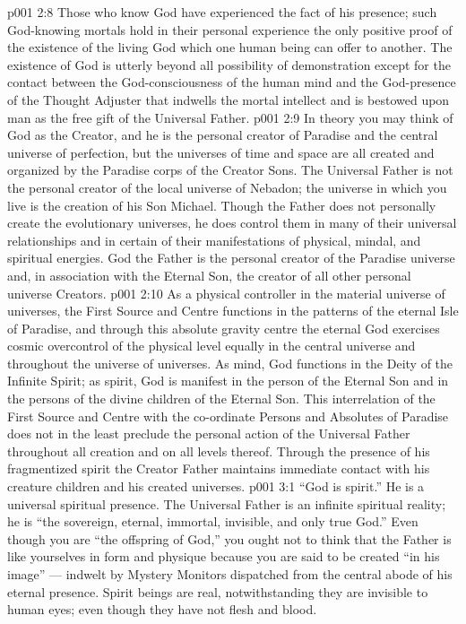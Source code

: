 \vs p001 2:8 Those who know God have experienced the fact of his presence; such God\hyp{}knowing mortals hold in their personal experience the only positive proof of the existence of the living God which one human being can offer to another. The existence of God is utterly beyond all possibility of demonstration except for the contact between the God\hyp{}consciousness of the human mind and the God\hyp{}presence of the Thought Adjuster that indwells the mortal intellect and is bestowed upon man as the free gift of the Universal Father.
\vs p001 2:9 \pc In theory you may think of God as the Creator, and he is the personal creator of Paradise and the central universe of perfection, but the universes of time and space are all created and organized by the Paradise corps of the Creator Sons. The Universal Father is not the personal creator of the local universe of Nebadon; the universe in which you live is the creation of his Son Michael. Though the Father does not personally create the evolutionary universes, he does control them in many of their universal relationships and in certain of their manifestations of physical, mindal, and spiritual energies. God the Father is the personal creator of the Paradise universe and, in association with the Eternal Son, the creator of all other personal universe Creators.
\vs p001 2:10 \pc As a physical controller in the material universe of universes, the First Source and Centre functions in the patterns of the eternal Isle of Paradise, and through this absolute gravity centre the eternal God exercises cosmic overcontrol of the physical level equally in the central universe and throughout the universe of universes. As mind, God functions in the Deity of the Infinite Spirit; as spirit, God is manifest in the person of the Eternal Son and in the persons of the divine children of the Eternal Son. This interrelation of the First Source and Centre with the co\hyp{}ordinate Persons and Absolutes of Paradise does not in the least preclude the  personal action of the Universal Father throughout all creation and on all levels thereof. Through the presence of his fragmentized spirit the Creator Father maintains immediate contact with his creature children and his created universes.
\vs p001 3:1 “God is spirit.” He is a universal spiritual presence. The Universal Father is an infinite spiritual reality; he is “the sovereign, eternal, immortal, invisible, and only true God.” Even though you are “the offspring of God,” you ought not to think that the Father is like yourselves in form and physique because you are said to be created “in his image” --- indwelt by Mystery Monitors dispatched from the central abode of his eternal presence. Spirit beings are real, notwithstanding they are invisible to human eyes; even though they have not flesh and blood.
